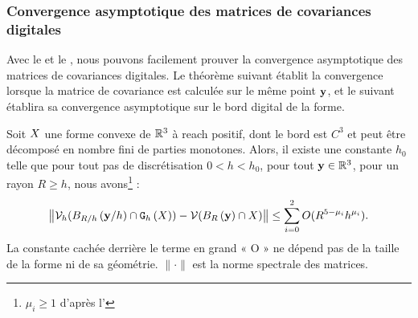 \subsubsection{Convergence asymptotique des matrices de covariances digitales}
%
Avec le  et le
, nous pouvons facilement prouver la
convergence asymptotique des matrices de covariances digitales. Le théorème
suivant établit la convergence lorsque la matrice de covariance est calculée sur
le même point $\mathbf{y}$, et le suivant établira sa convergence asymptotique sur le
bord digital de la forme.
%
\begin{theorem}{}
  \label{thm:conv-cov-matrix}
%
  Soit $X$ une forme convexe de $\mathbb{R}^3$ à reach positif, dont le bord est
  $C^3$ et peut être décomposé en nombre fini de parties monotones. Alors, il
  existe une constante $h_0$ telle que pour tout pas de discrétisation $0 < h <
  h_0$, pour tout $\mathbf{y} \in \mathbb{R}^3$, pour un rayon $R \ge h$, nous
  avons\footnote{$\mu_i \ge 1$ d'après
  l'} :
%
  \begin{equation}
    \left \| \mathcal{V}_{h}( B_{R/h}\left(\mathbf{y}/h\right) \cap  \mathtt{G}_{h}\left(X\right) ) - \mathcal{V}( B_{R}\left(\mathbf{y}\right) \cap X )\right \| \le \sum_{i=0}^2 O(R^{5-\mu_i}h^{\mu_i}).
  \end{equation}
%
  La constante cachée derrière le terme en grand « O » ne dépend pas de la
  taille de la forme ni de sa géométrie. $\|\cdot\|$ est la norme spectrale des
  matrices.
%
\end{theorem}
